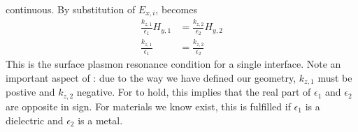 continuous. By substitution of $E_{x,i}$,  becomes
\begin{align}
\frac{k_{z,1}}{\epsilon_1}H_{y,1}&=\frac{k_{z,2}}{\epsilon_2}H_{y,2}\\ 
\frac{k_{z,1}}{\epsilon_1}&=\frac{k_{z,2}}{\epsilon_2} 
\label{eqn:sprcondition}
\end{align}
This is the surface plasmon resonance condition for a single interface.  Note an important aspect
of :  due to the way we have defined our
geometry, $k_{z,1}$ must be postive and $k_{z,2}$ negative.  For
 to hold, this implies that the real part of
$\epsilon_1$ and $\epsilon_2$ are opposite in sign.  For materials we know
exist, this is fulfilled if $\epsilon_1$ is a dielectric and $\epsilon_2$
is a metal.
